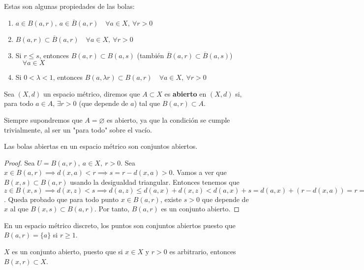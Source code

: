 \begin{properties} Estas son algunas propiedades de las bolas:
  \begin{enumerate}
    \item $a \in B(a,r),\ a \in \overline{B}(a,r) \quad \forall a \in X,\ \forall r>0$
    \item $B(a,r) \subset \overline{B}(a,r) \quad \forall a \in X,\ \forall r>0$
    \item Si $r \leq s$, entonces $B(a,r) \subset B(a,s)$ (también $\overline{B}(a,r) \subset \overline{B}(a,s)$) $\quad \forall a \in X$
    \item Si $0<\lambda<1$, entonces $B(a,\lambda r) \subset B(a,r) \quad \forall a \in X,\ \forall r>0$
  \end{enumerate}
\end{properties}

\begin{ndef}[Abierto]
  Sea $(X,d)$ un espacio métrico, diremos que $A \subset X$ es \textbf{abierto} en $(X,d)$ si, para todo $a \in A$, $\exists r > 0$ (que depende de $a$) tal que $B(a,r) \subset A$.
\end{ndef}
\begin{note}
    Siempre supondremos que $A = \varnothing$ es abierto, ya que la condición se cumple trivialmente, al ser un "para todo" sobre el vacío.
\end{note}
\begin{properties}
  Las bolas abiertas en un espacio métrico son conjuntos abiertos.
\end{properties}
\begin{proof}
  Sea $U=B(a,r),\ a \in X,\ r>0$. Sea $x \in B(a,r) \implies d(x,a)<r \implies s=r-d(x,a)>0$. Vamos a ver que $B(x,s) \subset B(a,r)$ usando la desigualdad triangular. Entonces tenemos que $z \in B(x,s) \implies d(x,z)<s \implies d(a,z) \leq d(a,x) + d(x,z)<d(a,x)+s=d(a,x)+(r-d(x,a))=r \implies z \in B(a,r) \implies B(x,s) \subset B(a,r)$. Queda probado que para todo punto $x \in B(a,r)$, existe $s>0$ que depende de $x$ al que $B(x,s) \subset B(a,r)$. Por tanto, $B(a,r)$ es un conjunto abierto.
\end{proof}
\begin{exmp}
  En un espacio métrico discreto, los puntos son conjuntos abiertos puesto que $B(a,r)=\{a\}$ si $r \geq 1$.
\end{exmp}
\begin{exmp}
  $X$ es un conjunto abierto, puesto que si $x \in X$ y $r>0$ es arbitrario, entonces $B(x,r) \subset X$.
\end{exmp}

